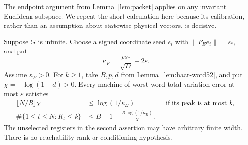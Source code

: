 The endpoint argument from Lemma~\ref{lem:packet} applies on any
invariant Euclidean subspace. We repeat the short calculation here
because its calibration, rather than an assumption about statewise
physical vectors, is decisive.

\begin{theorem}\label{thm:noisy-budget52}
Suppose $G$ is infinite. Choose a signed coordinate seed $e_i$ with
$\|P_Ee_i\|=s_*$, and put
\begin{equation}\label{eq:kappa-moving52}
 \kappa_E=\frac{\rho s_*}{\sqrt D}-2\varepsilon.
\end{equation}
Assume $\kappa_E>0$. For $k\ge1$, take $B,p,d$ from
Lemma~\ref{lem:haar-word52}, and put $\chi=-\log(1-d)>0$.
Every machine of worst-word total-variation error at most
$\varepsilon$ satisfies
\begin{align}
 \lfloor N/B\rfloor\chi&\le\log(1/\kappa_E)
       &&\text{if its peak is at most }k,\label{eq:noisy-peak52}\\
 \#\{1\le t\le N:K_t\le k\}
       &\le B-1+\frac{B\log(1/\kappa_E)}{\chi}.
       \label{eq:noisy-occupation52}
\end{align}
The unselected registers in the second assertion may have arbitrary
finite width. There is no reachability-rank or conditioning hypothesis.
\end{theorem}
